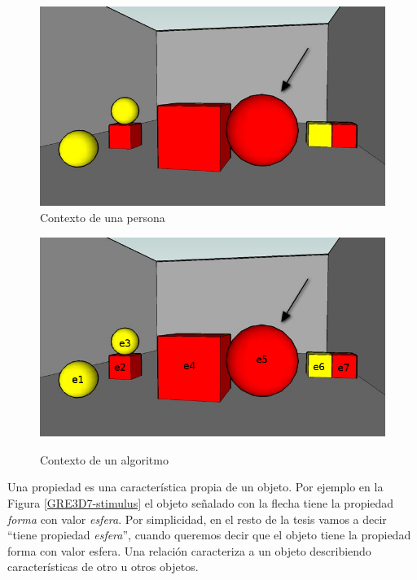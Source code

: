 \begin{figure}[!ht]
\begin{minipage}[t]{0.5\linewidth}
\centering
\includegraphics[width=\textwidth]{images/22sinLetras.jpg}\\[0pt]
\caption{Contexto de una persona}
\label{GRE3D7-stimulus}
\vspace*{.1cm}
\end{minipage}
\hspace*{0cm}
\begin{minipage}[t]{0.5\linewidth}
\centering
\includegraphics[width=\textwidth]{images/22.jpg}\\[0pt]
\caption{Contexto de un algoritmo}
\label{GRE3D7-stimulus-conLetras}
\end{minipage}
\end{figure}




Una propiedad es una caracter\'istica propia de un objeto. Por ejemplo en la Figura \ref{GRE3D7-stimulus} el objeto se\~nalado con la flecha tiene la propiedad {\it forma} con valor {\it esfera}. Por simplicidad, en el resto de la tesis vamos a decir ``tiene propiedad {\it esfera}'', cuando queremos decir que el objeto tiene la propiedad forma con valor esfera. Una relaci\'on caracteriza a un objeto describiendo caracter\'isticas de otro u otros objetos.

